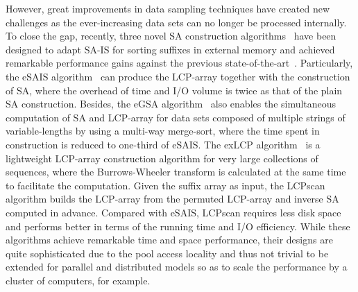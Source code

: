 \documentclass[10pt,journal,compsoc]{IEEEtran}
\begin{document}
\begin{CJK*}{GBK}{song}
However, great improvements in data sampling techniques have created new challenges as the ever-increasing data sets can no longer be processed internally. To close the gap, recently, three novel SA construction algorithms~\cite{Nong15, Bingmann12, Nong14} have been designed to adapt SA-IS for sorting suffixes in external memory and achieved remarkable performance gains against the previous state-of-the-art~\cite{Dementiev08}.  Particularly, the eSAIS algorithm~\cite{Bingmann12} can produce the LCP-array together with the construction of SA, where the overhead of time and I/O volume is twice as that of the plain SA construction. Besides, the eGSA algorithm~\cite{Felipe2013} also enables the simultaneous computation of SA and LCP-array for data sets composed of multiple strings of variable-lengths by using a multi-way merge-sort, where the time spent in construction is reduced to one-third of eSAIS. The exLCP algorithm~\cite{Markus2012} is a lightweight LCP-array construction algorithm for very large collections of sequences, where the Burrows-Wheeler transform is calculated at the same time to facilitate the computation. Given the suffix array as input, the LCPscan algorithm \cite{Juha2014} builds the LCP-array from the permuted LCP-array and inverse SA computed in advance. Compared with eSAIS, LCPscan requires less disk space and performs better in terms of the running time and I/O efficiency. While these algorithms achieve remarkable time and space performance, their designs are quite sophisticated due to the pool access locality and thus not trivial to be extended for parallel and distributed models so as to scale the performance by a cluster of computers, for example.


\end{CJK*}
\end{document}

